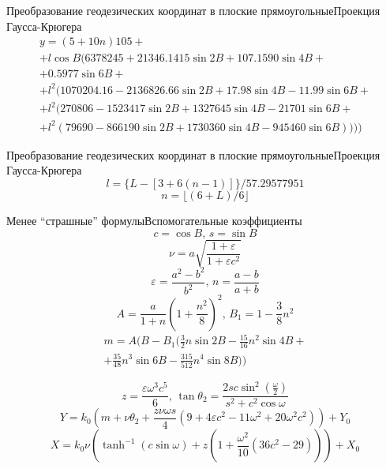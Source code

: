 \documentclass[aspectratio=43]{beamer}
\begin{document}
\begin{frame}{Преобразование геодезических координат в плоские прямоугольные}{Проекция Гаусса-Крюгера}
\begin{multline}\nonumber
y = (5 + 10 n)  105 +\\+ l \cos B (6378245 + 21346.1415 \sin2 B +107.1590 \sin4 B +\\
+ 0.5977 \sin6 B +\\+ l^2 (1070204.16 - 2136826.66 \sin2 B + 17.98 \sin4 B - 11.99 \sin6 B +\\
+ l^2 (270806 - 1523417 \sin2 B + 1327645 \sin4 B - 21701 \sin6 B +\\
+ l^2 (79690 - 866190 \sin2 B + 1730360 \sin4 B - 945460 \sin6 B))))
\end{multline}
\end{frame}

\begin{frame}{Преобразование геодезических координат в плоские прямоугольные}{Проекция Гаусса-Крюгера}
$$l=\{L-[3+6(n-1)]\}/57.29577951$$
$$n=\lfloor(6+L)/6\rfloor$$
\end{frame}

\begin{frame}{Менее ``страшные'' формулы}{Вспомогательные коэффициенты}
$$c=\cos B\mbox{, }s=\sin B$$
$$\nu=a\sqrt{\frac{1+\varepsilon}{1+\varepsilon c^2}}$$
$$\varepsilon=\frac{a^2-b^2}{b^2}\mbox{, }n=\frac{a-b}{a+b}$$
$$A=\frac{a}{1+n}\left(1+\frac{n^2}{8}\right)^2\mbox{, }B_1=1-\frac{3}{8}n^2$$
\begin{multline}\nonumber
m=A \bigg(B-B_1\bigg(\frac{3}{2}n\sin2B-\frac{15}{16}n^2\sin4B+\\+\frac{35}{48}n^3\sin6B-\frac{315}{512}n^4\sin8B\bigg)\bigg)
\end{multline}
\end{frame}

\begin{frame}
$$z=\frac{\varepsilon\omega^3c^5}{6}\mbox{, }\tan\theta_2=\frac{2sc\sin^2\left(\frac{\omega}{2}\right)}{s^2+c^2\cos\omega}$$
$$Y=k_0\left(m+\nu\theta_2+\frac{z\nu\omega s}{4}\left(9+4\varepsilon c^2-11\omega^2+20\omega^2c^2\right)\right)+Y_0$$
$$X=k_0\nu\left(\tanh^{-1}\left(c\sin\omega\right)+z\left(1+\frac{\omega^2}{10}\left(36c^2-29\right)\right)\right)+X_0$$
\end{frame}
\end{document}

